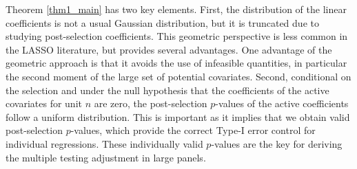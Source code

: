 \documentclass[11pt]{article}
\def\cmt#1{{\textcolor{red}{(#1)}}}
\begin{document}
	
	
	
	
	
	Theorem \ref{thm1_main} has two key elements. 
	First, the distribution of the linear coefficients is not a usual Gaussian distribution, but it is truncated due to studying post-selection coefficients. This geometric perspective is less common in the LASSO literature, but provides several advantages. One advantage of the geometric approach is that it avoids the use of infeasible quantities, in particular the second moment of the large set of potential covariates. Second, conditional on the selection and under the null hypothesis that the coefficients of the active covariates for unit $n$ are zero, the post-selection $p$-values of the active coefficients follow a uniform distribution. This is important as it implies that we obtain valid post-selection $p$-values, which provide the correct Type-I error control for individual regressions. These individually valid $p$-values are the key for deriving the multiple testing adjustment in large panels.
	
\end{document}
